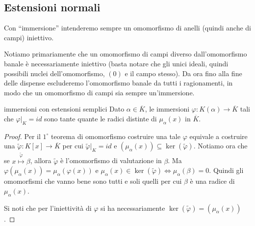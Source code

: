 \subsection{Estensioni normali}

Con ``immersione'' intenderemo sempre un omomorfismo di anelli (quindi anche di campi) iniettivo.
    
Notiamo primariamente che un omomorfismo di campi diverso dall'omomorfismo banale è necessariamente iniettivo (basta notare che gli unici ideali, quindi possibili nuclei dell'omomorfismo, $(0)$ e il campo stesso). Da ora fino alla fine delle dispense escluderemo l'omomorfismo banale da tutti i ragionamenti, in modo che un omomorfismo di campi sia sempre un'immersione.

\begin{proposition}{immersioni con estensioni semplici}
    Dato $\alpha \in \overline{K}$, le immersioni $\varphi: K(\alpha) \rightarrow \overline{K}$ tali che $\varphi|_K = id$ sono tante quante le radici distinte di $\mu_{\alpha}(x)$ in $\overline{K}$.
\end{proposition}    
\begin{proof}
    Per il $1^{\circ}$ teorema di omomorfismo costruire una tale $\varphi$ equivale a costruire una $\tilde \varphi: K[x] \rightarrow \overline{K}$ per cui $\tilde \varphi |_K = id$ e $(\mu_{\alpha}(x)) \subseteq \ker(\tilde \varphi)$. Notiamo ora che se $x \overset{\tilde \varphi}{\mapsto} \beta$, allora $\tilde \varphi$ è l'omomorfismo di valutazione in $\beta$. Ma $\varphi(\mu_{\alpha}(x)) = \mu_{\alpha}(\varphi(x))$ e $\mu_{\alpha}(x) \in  \ker(\tilde \varphi) \iff \mu_{\alpha}(\beta) = 0$. Quindi gli omomorfismi che vanno bene sono tutti e soli quelli per cui $\beta$ è una radice di $\mu_{\alpha}(x)$.

    Si noti che per l'iniettività di $\varphi$ si ha necessariamente $\ker(\tilde \varphi) = (\mu_\alpha(x))$.
\end{proof}

